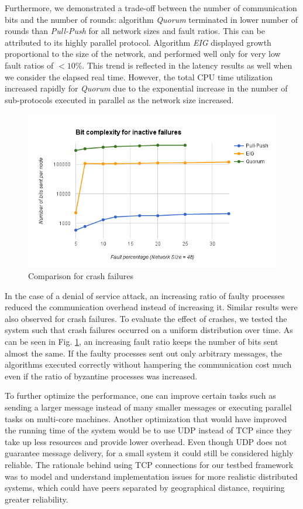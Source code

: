 Furthermore, we demonstrated a trade-off between the number of communication
bits and the number of rounds: algorithm \textit{Quorum} terminated in lower
number of rounds than \textit{Pull-Push} for all network sizes and fault
ratios. This can be attributed to its highly parallel protocol. Algorithm
\textit{EIG} displayed growth proportional to the size of the network, and
performed well only for very low fault ratios of $<10\%$. This trend is
reflected in the latency results as well when we consider the elapsed real
time. However, the total CPU time utilization increased rapidly for
\textit{Quorum} due to the exponential increase in the number of sub-protocols
executed in parallel as the network size increased.
\begin{figure}[h]
 \centering
\includegraphics[scale=0.4]{crash}
\caption{Comparison for crash failures}
 \label{fig:crash}
\end{figure}

In the case of a denial of service attack, an increasing ratio of faulty
processes reduced the communication overhead instead of increasing it. Similar
results were also observed for crash failures. To evaluate the effect of
crashes, we tested the system such that crash failures occurred on a uniform
distribution over time. As can be seen in Fig. \ref{fig:crash}, an increasing
fault ratio keeps the number of bits sent almost the same. If the faulty
processes sent out only arbitrary messages, the algorithms executed correctly
without hampering the communication cost much even if the ratio of byzantine
processes was increased.

To further optimize the performance, one can improve certain tasks such as
sending a larger message instead of many smaller messages or executing parallel
tasks on multi-core machines. Another optimization that would have improved the
running time of the system would be to use UDP instead of TCP since they take
up less resources and provide lower overhead. Even though UDP does not
guarantee message delivery, for a small system it could still be considered
highly reliable. The rationale behind using TCP connections for our testbed
framework was to model and understand implementation issues for more realistic
distributed systems, which could have peers separated by geographical distance,
requiring greater reliability. 

